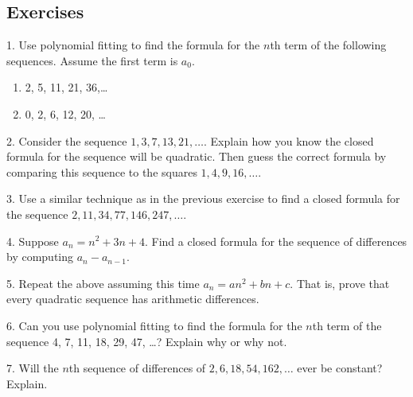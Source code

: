\documentclass[10pt,]{book}
\theoremstyle{plain}
\theoremstyle{definition}
\theoremstyle{definition}
\theoremstyle{definition}
\numberwithin{equation}{chapter}
\begin{document}
\subsection[Exercises]{Exercises}\label{exercises-14}
\begin{exerciselist}
\item[1.]\hypertarget{exercise-154}{}
Use polynomial fitting to find the formula for the \(n\)th term of the following sequences. Assume the first term is \(a_0\).
%
\leavevmode%
\begin{enumerate}[label=(\alph*)]
\item\hypertarget{li-929}{}
2, 5, 11, 21, 36,\dots{}
%
\item\hypertarget{li-930}{}
0, 2, 6, 12, 20, \dots{}
%
\end{enumerate}
\par\smallskip
\item[2.]\hypertarget{exercise-155}{}
Consider the sequence \(1, 3, 7, 13, 21, \ldots\). Explain how you know the closed formula for the sequence will be quadratic. Then guess the correct formula by comparing this sequence to the squares \(1, 4, 9, 16, \ldots\).
%
\par\smallskip
\item[3.]\hypertarget{exercise-156}{}
Use a similar technique as in the previous exercise to find a closed formula for the sequence \(2, 11, 34, 77, 146, 247,\ldots\).
%
\par\smallskip
\item[4.]\hypertarget{exercise-157}{}
Suppose \(a_n = n^2 + 3n + 4\). Find a closed formula for the sequence of differences by computing \(a_n - a_{n-1}\).
%
\par\smallskip
\item[5.]\hypertarget{exercise-158}{}
Repeat the above assuming this time \(a_n = an^2 + bn + c\). That is, prove that every quadratic sequence has arithmetic differences.
%
\par\smallskip
\item[6.]\hypertarget{exercise-159}{}
Can you use polynomial fitting to find the formula for the \(n\)th term of the sequence 4, 7, 11, 18, 29, 47, \dots{}? Explain why or why not.
%
\par\smallskip
\item[7.]\hypertarget{exercise-160}{}
Will the \(n\)th sequence of differences of \(2, 6, 18, 54, 162, \ldots\) ever be constant? Explain.
%
\par\smallskip
\end{exerciselist}
\typeout{************************************************}
\typeout{************************************************}
\end{document}
